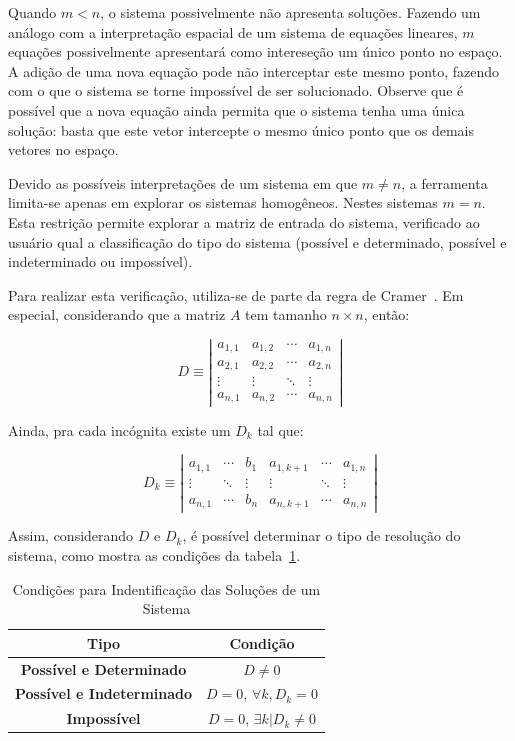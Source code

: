 \documentclass[a4paper,10pt]{report}
\begin{document}
Quando $m < n$, o sistema possivelmente não apresenta soluções. Fazendo um análogo com a interpretação espacial de um sistema de equações lineares, $m$ equações possivelmente apresentará como intereseção um único ponto no espaço. A adição de uma nova equação pode não interceptar este mesmo ponto, fazendo com o que o sistema se torne impossível de ser solucionado. Observe que é possível que a nova equação ainda permita que o sistema tenha uma única solução: basta que este vetor intercepte o mesmo único ponto que os demais vetores no espaço.

Devido as possíveis interpretações de um sistema em que $m \neq n$, a ferramenta limita-se apenas em explorar os sistemas homogêneos. Nestes sistemas $m = n$. Esta restrição permite explorar a matriz de entrada do sistema, verificado ao usuário qual a classificação do tipo do sistema (possível e determinado, possível e indeterminado ou impossível).

Para realizar esta verificação, utiliza-se de parte da regra de Cramer~\cite{cramer}. Em especial, considerando que a matriz $A$ tem tamanho $n \times n$, então:

\[
D \equiv \left| \begin{array}{cccc}
a_{1,1} & a_{1,2} & \cdots & a_{1,n} \\
a_{2,1} & a_{2,2} & \cdots & a_{2,n} \\
\vdots  & \vdots & \ddots & \vdots \\
a_{n,1} & a_{n,2} & \cdots & a_{n,n}
\label{arr:detcoeficientes}
\end{array}\right|
\]

Ainda, pra cada incógnita existe um $D_{k}$ tal que:

\[
D_{k} \equiv \left| \begin{array}{ccccccc}
a_{1,1} & \cdots & b_{1} & a_{1,k+1} & \cdots & a_{1,n}\\
\vdots  & \ddots & \vdots & \vdots  & \ddots & \vdots \\
a_{n,1} & \cdots & b_{n} & a_{n,k+1} & \cdots & a_{n,n}
\label{arr:detcoeficientesk}
\end{array}\right|
\]

Assim, considerando $D$ e $D_{k}$, é possível determinar o tipo de resolução do sistema, como mostra as condições da tabela~\ref{tab:sistemad}.

\begin{table}[ht]
\centering
\caption{Condições para Indentificação das Soluções de um Sistema}
        \begin{tabular}{|c|c|}
        \hline
        \textbf{Tipo} & \textbf{Condição} \\ \hline
        \textbf{Possível e Determinado} & $D \neq 0$ \\ \hline
        \textbf{Possível e Indeterminado} & $D = 0$, $\forall k, D_{k} = 0$ \\ \hline
        \textbf{Impossível} & $D = 0$, $\exists k | D_{k} \neq 0$ \\ \hline
        \end{tabular}
\label{tab:sistemad}
\end{table} 
\end{document}
